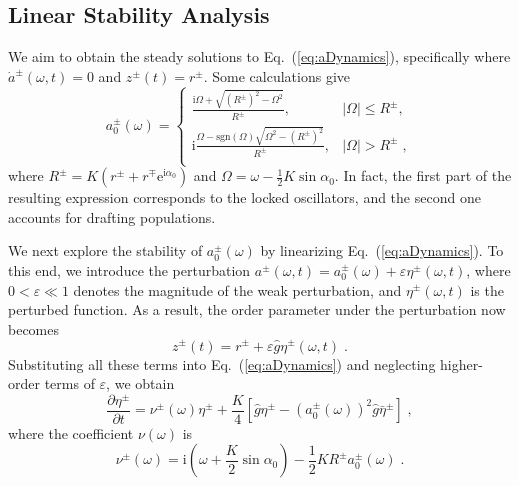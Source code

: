 \documentclass{article}
\begin{document}
\subsection{Linear Stability Analysis}
We aim to obtain the steady solutions to Eq.~(\ref{eq:aDynamics}), specifically where $\dot{a}^{\pm}\left(\omega, t\right)=0$ and $z^{\pm}\left(t\right)=r^{\pm}$. 
Some calculations give
\begin{equation}
    \label{eq:steadyState}
    a_{0}^{\pm}\left( \omega \right) =\begin{cases}
        \frac{\mathrm{i}\Omega +\sqrt{\left( R^{\pm} \right) ^2-\Omega ^2}}{R^{\pm}},&		\left| \Omega \right|\leqslant R^{\pm},\;\\
        \mathrm{i}\frac{\Omega -\text{sgn} \left( \Omega \right) \sqrt{\Omega ^2-\left( R^{\pm} \right) ^2}}{R^{\pm}},&		\left| \Omega \right|>R^{\pm}\;,\\
    \end{cases}
\end{equation}
where $R^{\pm}=K\left(r^{\pm}+r^{\mp}\mathrm{e}^{\mathrm{i}\alpha_0}\right)$ and $\Omega=\omega-\frac{1}{2}K\sin\alpha_0$.  
In fact, the first part of the resulting expression corresponds to the locked oscillators, and the second one accounts for drafting populations.

We next explore the stability of $a_{0}^{\pm}\left( \omega \right)$ by linearizing Eq.~(\ref{eq:aDynamics}).
To this end, we introduce the perturbation $a^{\pm}\left( \omega ,t \right) =a_{0}^{\pm}\left( \omega \right) +\varepsilon \eta^{\pm} \left( \omega ,t \right)$, where $0 < \varepsilon \ll 1$ denotes the magnitude of the weak perturbation, and $\eta^{\pm} \left( \omega ,t \right)$ is the perturbed function.
As a result, the order parameter under the perturbation now becomes
\begin{equation}
    z^{\pm}\left( t \right) =r^{\pm}+\varepsilon \hat{g}\eta^{\pm} \left( \omega ,t \right)\;.
\end{equation}
Substituting all these terms into Eq.~(\ref{eq:aDynamics}) and neglecting higher-order terms of $\varepsilon$, we obtain
\begin{equation}
    \label{eq:etaDynamics}
    \frac{\partial \eta ^{\pm}}{\partial t}=\nu^{\pm} \left( \omega \right) \eta ^{\pm}+\frac{K}{4}\left[ \hat{g}\eta^{\pm} -\left( a_{0}^{\pm}\left( \omega \right) \right) ^2\hat{g}\bar{\eta}^{\pm} \right] \;,
\end{equation}
where the coefficient $\nu \left( \omega \right)$ is
\begin{equation}
    \nu ^{\pm}\left( \omega \right) =\text{i}\left( \omega +\frac{K}{2}\sin \alpha _0 \right) -\frac{1}{2}KR^{\pm}a_{0}^{\pm}\left( \omega \right) \;.
\end{equation}
\end{document}
